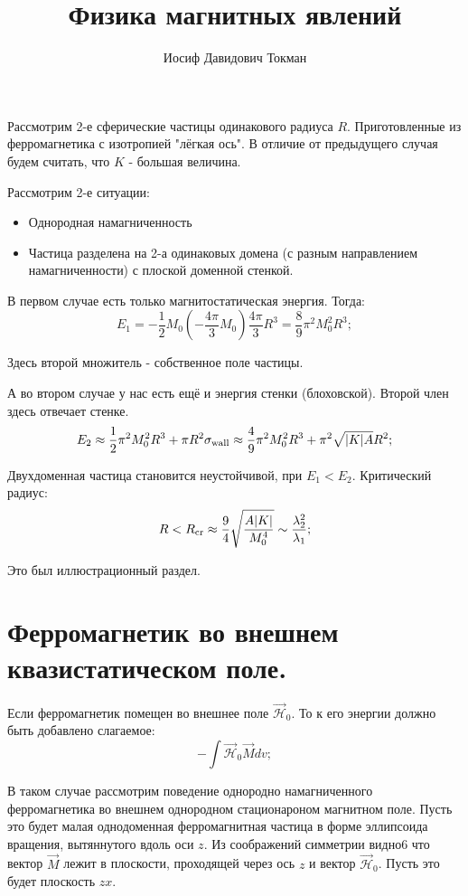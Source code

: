 \documentclass[a4paper, 14pt, russian]{article}
\title{Физика магнитных явлений}
\author{Иосиф Давидович Токман}
\date{}
\newcommand{\be}{\begin{equation}}
\newcommand{\ee}{\end{equation}}
\begin{document}
	\maketitle

	Рассмотрим 2-е сферические частицы одинакового радиуса $R$. Приготовленные из
	ферромагнетика с изотропией "лёгкая ось". В отличие от предыдущего случая
	будем считать, что $K$ - большая величина.

	Рассмотрим 2-е ситуации:
	\begin{itemize}
		\item Однородная намагниченность
		\item Частица разделена на 2-а одинаковых домена 
			(с разным направлением намагниченности) с плоской доменной стенкой.
	\end{itemize}

	В первом случае есть только магнитостатическая энергия. Тогда:
	\be
		\label{eq170}
		E_1 = - \frac{1}{2} M_0 (- \frac{4\pi}{3} M_0) \frac{4\pi}{3} R^3 
			= \frac{8}{9} \pi^2 M_0^2 R^3;
	\ee

	Здесь второй множитель - собственное поле частицы.

	А во втором случае у нас есть ещё и энергия стенки (блоховской).
	Второй член здесь отвечает стенке.
	\be
		\label{eq171}
		E_2 \approx \frac{1}{2} \pi^2 M_0^2 R^3 + \pi R^2 \sigma_\text{wall}
			\approx \frac{4}{9} \pi^2 M_0^2 R^3 + \pi^2 \sqrt{\abs{K} A} R^2;
	\ee

	Двухдоменная частица становится неустойчивой, при $E_1 < E_2$.
	Критический радиус:
	\be
		\label{eq172}
		R < R_\text{cr} \approx \frac{9}{4} \sqrt{\frac{A \abs{K}}{M_0^4}}
			\sim \frac{\lambda_2^2}{\lambda_1};
	\ee

	Это был иллюстрационный раздел.

	\section{Ферромагнетик во внешнем квазистатическом поле.}

	Если ферромагнетик помещен во внешнее поле $\vec{\mathcal H}_0$. 
	То к его энергии должно быть добавлено слагаемое:
	\be
		\label{eq173}
		- \int \vec{\mathcal H}_0 \vec M dv;
	\ee

	В таком случае рассмотрим поведение однородно намагниченного ферромагнетика во внешнем
	однородном стационароном магнитном поле. Пусть это будет малая однодоменная
	ферромагнитная частица в форме эллипсоида вращения, вытяннутого вдоль оси $z$.
	Из соображений симметрии видно6 что вектор $\vec M$ лежит в плоскости, проходящей через
	ось $z$ и вектор $\vec{\mathcal H}_0$. Пусть это будет плоскость $zx$.
\end{document}
